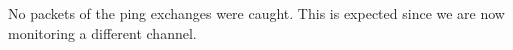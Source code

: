 No packets of the ping exchanges were caught. This is expected since we are now monitoring a different channel.
